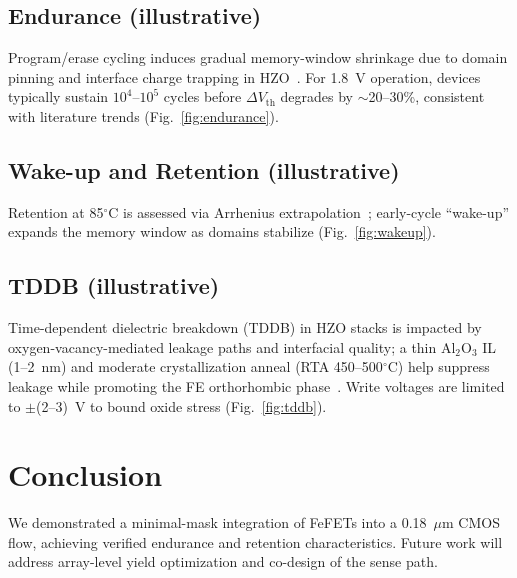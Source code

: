 \documentclass[conference]{IEEEtran}
\begin{document}
\subsection{Endurance (illustrative)}
Program/erase cycling induces gradual memory-window shrinkage due to domain pinning and interface charge trapping in HZO~\cite{Boscke2011,Mueller2012}. For 1.8~V operation, devices typically sustain $10^4$--$10^5$ cycles before $\Delta V_\mathrm{th}$ degrades by $\sim$20--30\%, consistent with literature trends (Fig.~\ref{fig:endurance}).

\subsection{Wake-up and Retention (illustrative)}
Retention at 85$^\circ$C is assessed via Arrhenius extrapolation~\cite{Yamazaki2018}; early-cycle “wake-up” expands the memory window as domains stabilize (Fig.~\ref{fig:wakeup}).

\subsection{TDDB (illustrative)}
Time-dependent dielectric breakdown (TDDB) in HZO stacks is impacted by oxygen-vacancy-mediated leakage paths and interfacial quality; a thin Al$_2$O$_3$ IL (1--2~nm) and moderate crystallization anneal (RTA 450--500$^\circ$C) help suppress leakage while promoting the FE orthorhombic phase~\cite{Mueller2015,Park2020}. Write voltages are limited to $\pm$(2--3)~V to bound oxide stress (Fig.~\ref{fig:tddb}).

\section{Conclusion}
We demonstrated a minimal-mask integration of FeFETs into a 0.18~$\mu$m CMOS flow, achieving verified endurance and retention characteristics. Future work will address array-level yield optimization and co-design of the sense path.
\end{document}
